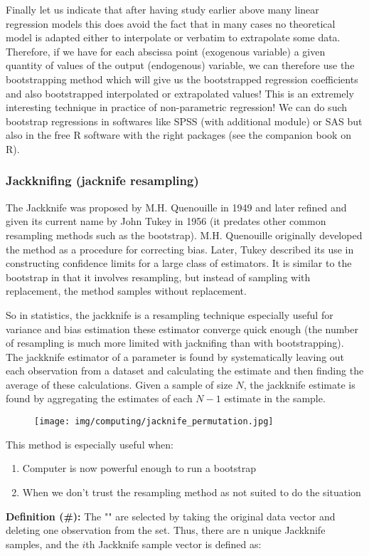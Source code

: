 	Finally let us indicate that after having study earlier above many linear regression models this does avoid the fact that in many cases no theoretical model is adapted either to interpolate or verbatim to extrapolate some data. Therefore, if we have for each abscissa point (exogenous variable) a given quantity of values  of the output (endogenous) variable, we can therefore use the bootstrapping method which will give us the bootstrapped regression coefficients and also bootstrapped interpolated or extrapolated values! This is an extremely interesting technique  in practice of non-parametric regression! We can do such bootstrap regressions in softwares like SPSS (with additional module) or SAS but also in the free R software with the right packages (see the companion book on R).
	
	\pagebreak
	\subsubsection{Jackknifing (jacknife resampling)}\label{jacknife resampling}
	The Jackknife was proposed by M.H. Quenouille in 1949 and later refined and given its current name by John Tukey in 1956 (it predates other common resampling methods such as the bootstrap). M.H. Quenouille originally developed the method as a procedure for correcting bias. Later, Tukey described its use in constructing confidence limits for a large class of estimators. It is similar to the bootstrap in that it involves resampling, but instead of sampling with replacement, the method samples without replacement.

	So in statistics, the jackknife is a resampling technique especially useful for variance and bias estimation these estimator converge quick enough (the number of resampling is much more limited with jacknifing than with bootstrapping). The jackknife estimator of a parameter is found by systematically leaving out each observation from a dataset and calculating the estimate and then finding the average of these calculations. Given a sample of size $N$, the jackknife estimate is found by aggregating the estimates of each $N-1$ estimate in the sample.
	\begin{figure}[H]
		\centering
		\texttt{[image: img/computing/jacknife\_permutation.jpg]}
	\end{figure}
	This method is especially useful when:
	\begin{enumerate}
		\item Computer is now powerful enough to run a bootstrap
		\item When we don't trust the resampling method as not suited to do the situation
	\end{enumerate}
	\textbf{Definition (\#\mydef):} The "" are selected by taking the original data vector and deleting one observation from the set. Thus, there are n unique Jackknife samples, and the $i$th Jackknife sample vector is defined as:

